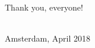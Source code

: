 
\acknowledgments

Thank you, everyone! %

\begin{flushright}
\myshortauthor \\
Amsterdam, April 2018 %
\end{flushright}
